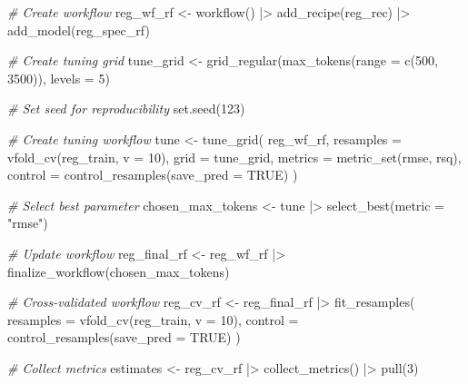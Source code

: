 \documentclass[
  letterpaper,
  DIV=11,
  numbers=noendperiod]{scrreprt}
\newenvironment{Shaded}{\begin{snugshade}}{\end{snugshade}}
\newcommand{\AttributeTok}[1]{\textcolor[rgb]{0.00,0.00,0.00}{#1}}
\newcommand{\CommentTok}[1]{\textcolor[rgb]{0.00,0.00,0.00}{\textit{#1}}}
\newcommand{\ConstantTok}[1]{\textcolor[rgb]{0.00,0.00,0.00}{#1}}
\newcommand{\DecValTok}[1]{\textcolor[rgb]{0.00,0.00,0.00}{#1}}
\newcommand{\FunctionTok}[1]{\textcolor[rgb]{0.00,0.00,0.00}{#1}}
\newcommand{\NormalTok}[1]{\textcolor[rgb]{0.00,0.00,0.00}{#1}}
\newcommand{\OtherTok}[1]{\textcolor[rgb]{0.00,0.00,0.00}{#1}}
\newcommand{\SpecialCharTok}[1]{\textcolor[rgb]{0.00,0.00,0.00}{#1}}
\newcommand{\StringTok}[1]{\textcolor[rgb]{0.00,0.00,0.00}{#1}}
\theoremstyle{definition}
\theoremstyle{remark}
\begin{document}
\begin{Shaded}
\begin{Highlighting}[]
\CommentTok{\# Create workflow}
\NormalTok{reg\_wf\_rf }\OtherTok{\textless{}{-}}
  \FunctionTok{workflow}\NormalTok{() }\SpecialCharTok{|\textgreater{}}
  \FunctionTok{add\_recipe}\NormalTok{(reg\_rec) }\SpecialCharTok{|\textgreater{}}
  \FunctionTok{add\_model}\NormalTok{(reg\_spec\_rf)}

\CommentTok{\# Create tuning grid}
\NormalTok{tune\_grid }\OtherTok{\textless{}{-}}
  \FunctionTok{grid\_regular}\NormalTok{(}\FunctionTok{max\_tokens}\NormalTok{(}\AttributeTok{range =} \FunctionTok{c}\NormalTok{(}\DecValTok{500}\NormalTok{, }\DecValTok{3500}\NormalTok{)), }\AttributeTok{levels =} \DecValTok{5}\NormalTok{)}

\CommentTok{\# Set seed for reproducibility}
\FunctionTok{set.seed}\NormalTok{(}\DecValTok{123}\NormalTok{)}

\CommentTok{\# Create tuning workflow}
\NormalTok{tune }\OtherTok{\textless{}{-}}
  \FunctionTok{tune\_grid}\NormalTok{(}
\NormalTok{    reg\_wf\_rf,}
    \AttributeTok{resamples =} \FunctionTok{vfold\_cv}\NormalTok{(reg\_train, }\AttributeTok{v =} \DecValTok{10}\NormalTok{),}
    \AttributeTok{grid =}\NormalTok{ tune\_grid,}
    \AttributeTok{metrics =} \FunctionTok{metric\_set}\NormalTok{(rmse, rsq),}
    \AttributeTok{control =} \FunctionTok{control\_resamples}\NormalTok{(}\AttributeTok{save\_pred =} \ConstantTok{TRUE}\NormalTok{)}
\NormalTok{  )}

\CommentTok{\# Select best parameter}
\NormalTok{chosen\_max\_tokens }\OtherTok{\textless{}{-}}
\NormalTok{  tune }\SpecialCharTok{|\textgreater{}}
  \FunctionTok{select\_best}\NormalTok{(}\AttributeTok{metric =} \StringTok{"rmse"}\NormalTok{)}

\CommentTok{\# Update workflow}
\NormalTok{reg\_final\_rf }\OtherTok{\textless{}{-}}
\NormalTok{  reg\_wf\_rf }\SpecialCharTok{|\textgreater{}}
  \FunctionTok{finalize\_workflow}\NormalTok{(chosen\_max\_tokens)}

\CommentTok{\# Cross{-}validated workflow}
\NormalTok{reg\_cv\_rf }\OtherTok{\textless{}{-}}
\NormalTok{  reg\_final\_rf }\SpecialCharTok{|\textgreater{}}
  \FunctionTok{fit\_resamples}\NormalTok{(}
    \AttributeTok{resamples =} \FunctionTok{vfold\_cv}\NormalTok{(reg\_train, }\AttributeTok{v =} \DecValTok{10}\NormalTok{),}
    \AttributeTok{control =} \FunctionTok{control\_resamples}\NormalTok{(}\AttributeTok{save\_pred =} \ConstantTok{TRUE}\NormalTok{)}
\NormalTok{  )}

\CommentTok{\# Collect metrics}
\NormalTok{estimates }\OtherTok{\textless{}{-}}
\NormalTok{  reg\_cv\_rf }\SpecialCharTok{|\textgreater{}}
  \FunctionTok{collect\_metrics}\NormalTok{() }\SpecialCharTok{|\textgreater{}}
  \FunctionTok{pull}\NormalTok{(}\DecValTok{3}\NormalTok{)}
\end{Highlighting}
\end{Shaded}
\end{document}
